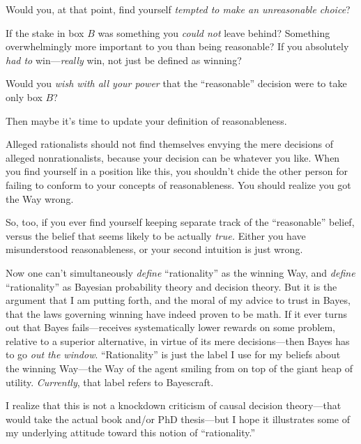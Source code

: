 {
 Would you, at that point, find yourself \textit{tempted to make an
unreasonable choice}?}


 If the stake in box $B$ was something you \textit{could not} leave
behind? Something overwhelmingly more important to you than being
reasonable? If you absolutely \textit{had to} win---\textit{really}
win, not just be defined as winning?


 Would you \textit{wish with all your power} that the
``reasonable'' decision were to take
only box $B$?


 Then maybe it's time to update your definition of
reasonableness.


 Alleged rationalists should not find themselves envying the mere
decisions of alleged nonrationalists, because your decision can be
whatever you like. When you find yourself in a position like this, you
shouldn't chide the other person for failing to conform
to your concepts of reasonableness. You should realize you got the Way
wrong.


 So, too, if you ever find yourself keeping separate track of the
``reasonable'' belief, versus the
belief that seems likely to be actually \textit{true.} Either you have
misunderstood reasonableness, or your second intuition is just wrong.


 Now one can't simultaneously \textit{define}
``rationality'' as the winning Way,
and \textit{define} ``rationality''
as Bayesian probability theory and decision theory. But it is the
argument that I am putting forth, and the moral of my advice to trust
in Bayes, that the laws governing winning have indeed proven to be
math. If it ever turns out that Bayes fails---receives systematically
lower rewards on some problem, relative to a superior alternative, in
virtue of its mere decisions---then Bayes has to go \textit{out the
window}. ``Rationality'' is just the
label I use for my beliefs about the winning Way---the Way of the agent
smiling from on top of the giant heap of utility. \textit{Currently},
that label refers to Bayescraft.


 I realize that this is not a knockdown criticism of causal
decision theory---that would take the actual book and/or PhD
thesis---but I hope it illustrates some of my underlying attitude
toward this notion of
``rationality.''

